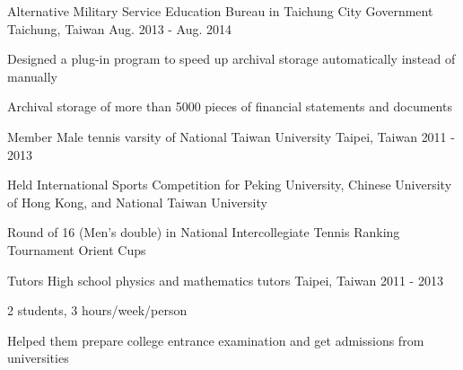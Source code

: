 


\begin{cventries}


\cventry
{Alternative Military Service} %
{Education Bureau in Taichung City Government} %
{Taichung, Taiwan} %
{Aug. 2013 - Aug. 2014} %
{ %
\begin{cvitems}
\item {Designed a plug-in program to speed up archival storage automatically instead of manually}
\item {Archival storage of more than 5000 pieces of financial statements and documents}
\end{cvitems}
}


\cventry
{Member} %
{Male tennis varsity of National Taiwan University} %
{Taipei, Taiwan} %
{2011 - 2013} %
{ %
\begin{cvitems}
\item {Held International Sports Competition for Peking University, Chinese University of Hong Kong, and National Taiwan University}
\item {Round of 16 (Men’s double) in National Intercollegiate Tennis Ranking Tournament Orient Cups}
\end{cvitems}
}


\cventry
{Tutors} %
{High school physics and mathematics tutors} %
{Taipei, Taiwan} %
{2011 - 2013} %
{ %
\begin{cvitems}
\item {2 students, 3 hours/week/person}
\item {Helped them prepare college entrance examination and get admissions from universities}
\end{cvitems}
}


\end{cventries}
